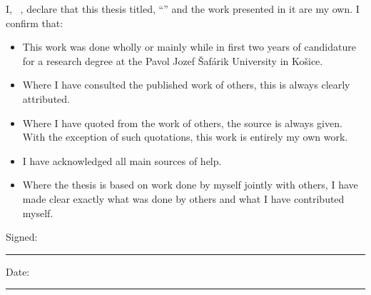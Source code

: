 \documentclass[12pt, english, 
oneside, 
onehalfspacing, %
toctotoc, %
headsepline, %
]{MastersDoctoralThesis} %
\begin{document}
\begin{declaration}
\addchaptertocentry{\authorshipname}

\noindent I, ~\authorname, declare that this thesis titled, \enquote{\ttitle} and the work presented in it are my own. I confirm that:

\begin{itemize}
\item This work was done wholly or mainly while in first two years of candidature for a research degree at the Pavol Jozef \v{S}af\'{a}rik University in Ko\v{s}ice.
\item Where I have consulted the published work of others, this is always clearly attributed.
\item Where I have quoted from the work of others, the source is always given. With the exception of such quotations, this work is entirely my own work.
\item I have acknowledged all main sources of help.
\item Where the thesis is based on work done by myself jointly with others, I have made clear exactly what was done by others and what I have contributed myself.\\[3.5cm]
\end{itemize}

\noindent Signed:\\
\rule[0.5em]{25em}{0.5pt} %

\noindent Date:\\
\rule[0.5em]{25em}{0.5pt} %
\end{declaration}

\cleardoublepage
\end{document}
